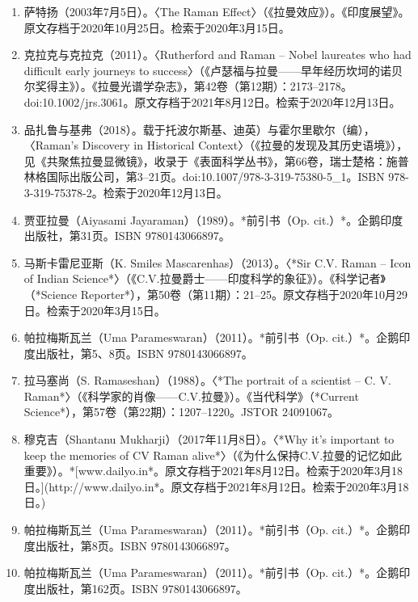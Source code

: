 \begin{enumerate}
\item 萨特扬（2003年7月5日）。〈The Raman Effect〉（《拉曼效应》）。《印度展望》。原文存档于2020年10月25日。检索于2020年3月15日。
\item 克拉克与克拉克（2011）。〈Rutherford and Raman – Nobel laureates who had difficult early journeys to success〉（《卢瑟福与拉曼——早年经历坎坷的诺贝尔奖得主》）。《拉曼光谱学杂志》，第42卷（第12期）：2173–2178。doi:10.1002/jrs.3061。原文存档于2021年8月12日。检索于2020年12月13日。
\item 品扎鲁与基弗（2018）。载于托波尔斯基、迪英）与霍尔里歇尔（编），〈Raman's Discovery in Historical Context〉（《拉曼的发现及其历史语境》），见《共聚焦拉曼显微镜》，收录于《表面科学丛书》，第66卷，瑞士楚格：施普林格国际出版公司，第3–21页。doi:10.1007/978-3-319-75380-5_1。ISBN 978-3-319-75378-2。检索于2020年12月13日。

\item 贾亚拉曼（Aiyasami Jayaraman）（1989）。*前引书（Op. cit.）*。企鹅印度出版社，第31页。ISBN 9780143066897。

\item 马斯卡雷尼亚斯（K. Smiles Mascarenhas）（2013）。〈*Sir C.V. Raman – Icon of Indian Science*〉（《C.V.拉曼爵士——印度科学的象征》）。《科学记者》（*Science Reporter*），第50卷（第11期）：21–25。原文存档于2020年10月29日。检索于2020年3月15日。

\item 帕拉梅斯瓦兰（Uma Parameswaran）（2011）。*前引书（Op. cit.）*。企鹅印度出版社，第5、8页。ISBN 9780143066897。

\item 拉马塞尚（S. Ramaseshan）（1988）。〈*The portrait of a scientist – C. V. Raman*〉（《科学家的肖像——C.V.拉曼》）。《当代科学》（*Current Science*），第57卷（第22期）：1207–1220。JSTOR 24091067。

\item 穆克吉（Shantanu Mukharji）（2017年11月8日）。〈*Why it's important to keep the memories of CV Raman alive*〉（《为什么保持C.V.拉曼的记忆如此重要》）。*[www.dailyo.in*。原文存档于2021年8月12日。检索于2020年3月18日。](http://www.dailyo.in*。原文存档于2021年8月12日。检索于2020年3月18日。)

\item 帕拉梅斯瓦兰（Uma Parameswaran）（2011）。*前引书（Op. cit.）*。企鹅印度出版社，第8页。ISBN 9780143066897。

\item 帕拉梅斯瓦兰（Uma Parameswaran）（2011）。*前引书（Op. cit.）*。企鹅印度出版社，第162页。ISBN 9780143066897。


\end{enumerate}
